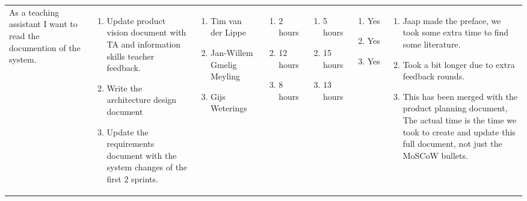 \documentclass[11pt,a4paper,landscape]{article}
\begin{document}
\begin{table}[h]
\begin{tabular}{|p{3cm}|p{5.0cm}|p{3.0cm}|p{2.2cm}|p{2.2cm}|p{2.0cm}|p{5cm}}

As a teaching assistant I want to read the documention of the system.
&
\begin{enumerate}
\item Update product vision document with TA and information skills teacher feedback.
\item Write the architecture design document
\item Update the requirements document with the system changes of the first 2 sprints.
\end{enumerate} 
           
&
\begin{enumerate}
\item Tim van der Lippe
\item Jan-Willem Gmelig Meyling
\item Gijs Weterings
\end{enumerate}
           
&

\begin{enumerate}
\item 2 hours
\item 12 hours
\item 8 hours
\end{enumerate}

&
\begin{enumerate}
\item 5 hours
\item 15 hours
\item 13 hours
\end{enumerate}

&
\begin{enumerate}
\item Yes
\item Yes
\item Yes
\end{enumerate}
&
\begin{enumerate}
\item Jaap made the preface, we took some extra time to find some literature.
\item Took a bit longer due to extra feedback rounds.
\item This has been merged with the product planning document, The actual time is the time we took to create and update this full document, not just the MoSCoW bullets.
\end{enumerate} 
\end{tabular}
\end{table}
\end{document}
